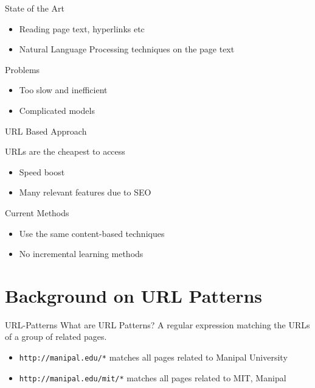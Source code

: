 \documentclass[presentation]{beamer}
\begin{document}
\begin{frame}[label={sec:orgheadline6}]{State of the Art}
\begin{itemize}
\item Reading page text, hyperlinks etc

\item Natural Language Processing techniques on the page text
\end{itemize}

\begin{block}{\alert{Problems}}
\begin{itemize}
\item Too slow and inefficient

\item Complicated models
\end{itemize}
\end{block}
\end{frame}

\begin{frame}[label={sec:orgheadline7}]{URL Based Approach}
\begin{block}{URLs are the cheapest to access}
\begin{itemize}
\item Speed boost
\item Many relevant features due to SEO
\end{itemize}
\end{block}

\begin{block}{Current Methods}
\begin{itemize}
\item Use the same content-based techniques
\item No incremental learning methods
\end{itemize}
\end{block}
\end{frame}

\section{Background on URL Patterns}
\label{sec:orgheadline12}

\begin{frame}[fragile,label={sec:orgheadline9}]{URL-Patterns}
 \alert{What are URL Patterns?}
A regular expression matching the URLs of a group of related pages.
\begin{itemize}
\item \texttt{http://manipal.edu/*} matches all pages related to Manipal University
\item \texttt{http://manipal.edu/mit/*} matches all pages related to MIT, Manipal
\end{itemize}
\end{frame}
\end{document}

